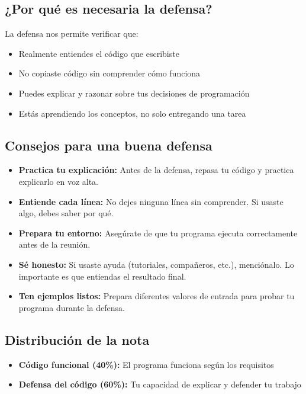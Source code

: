 \documentclass[12pt,a4paper]{article}
\begin{document}
\subsection{¿Por qué es necesaria la defensa?}

La defensa nos permite verificar que:
\begin{itemize}
    \item Realmente entiendes el código que escribiste
    \item No copiaste código sin comprender cómo funciona
    \item Puedes explicar y razonar sobre tus decisiones de programación
    \item Estás aprendiendo los conceptos, no solo entregando una tarea
\end{itemize}

\subsection{Consejos para una buena defensa}

\begin{itemize}[leftmargin=*]
    \item \textbf{Practica tu explicación:} Antes de la defensa, repasa tu código y practica explicarlo en voz alta.
    
    \item \textbf{Entiende cada línea:} No dejes ninguna línea sin comprender. Si usaste algo, debes saber por qué.
    
    \item \textbf{Prepara tu entorno:} Asegúrate de que tu programa ejecuta correctamente antes de la reunión.
    
    \item \textbf{Sé honesto:} Si usaste ayuda (tutoriales, compañeros, etc.), menciónalo. Lo importante es que entiendas el resultado final.
    
    \item \textbf{Ten ejemplos listos:} Prepara diferentes valores de entrada para probar tu programa durante la defensa.
\end{itemize}

\subsection{Distribución de la nota}

\begin{itemize}
    \item \textbf{Código funcional (40\%):} El programa funciona según los requisitos
    \item \textbf{Defensa del código (60\%):} Tu capacidad de explicar y defender tu trabajo
\end{itemize}
\end{document}
